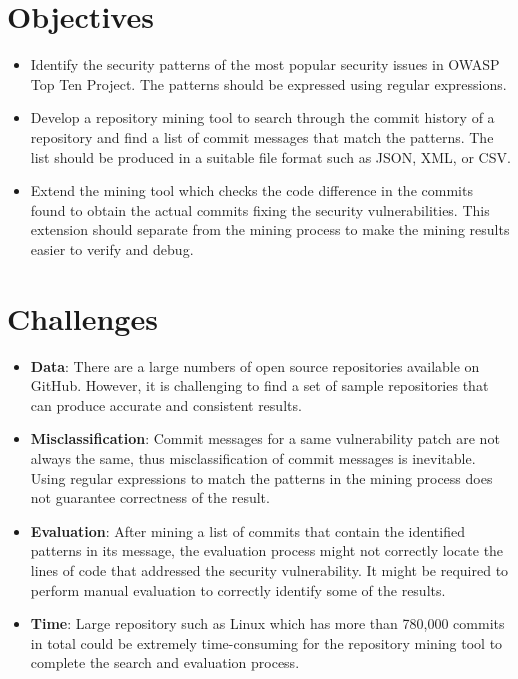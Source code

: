 \documentclass[12pt, a4paper]{report}
\begin{document}
\section{Objectives}
\label{sec:objectives}
\begin{itemize}
	\item Identify the security patterns of the most popular security issues in OWASP Top Ten Project.
	The patterns should be expressed using regular expressions.
	\item Develop a repository mining tool to search through the commit history of a repository and
	find a list of commit messages that match the patterns. The list should be produced in a suitable
	file format such as JSON, XML, or CSV.
	\item Extend the mining tool which checks the code difference in the commits found to obtain the
	actual commits fixing the security vulnerabilities. This extension should separate from the mining
	process to make the mining results easier to verify and debug.
\end{itemize}

\section{Challenges}
\begin{itemize}
	\item \textbf{Data}: There are a large numbers of open source repositories available on GitHub.
	However, it is challenging to find a set of sample repositories that can produce accurate and
	consistent results.
	\item \textbf{Misclassification}: Commit messages for a same vulnerability patch are not always
	the same, thus misclassification of commit messages is inevitable. Using regular expressions to
	match the patterns in the mining process does not guarantee correctness of the result.
	\item \textbf{Evaluation}: After mining a list of commits that contain the identified patterns in
	its message, the evaluation process might not correctly locate the lines of code that addressed
	the security vulnerability. It might be required to perform manual evaluation to correctly
	identify some of the results.
	\item \textbf{Time}: Large repository such as Linux which has more than 780,000 commits in total
	\cite{linux_repo} could be extremely time-consuming for the repository mining tool to complete the
	search and evaluation process.
\end{itemize}
\end{document}
